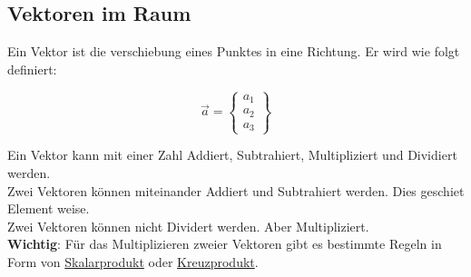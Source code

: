 \subsection{Vektoren im Raum}
Ein Vektor ist die verschiebung eines Punktes in eine Richtung.
Er wird wie folgt definiert: 

\[
\vec{a} =
\begin{Bmatrix}
    a_1 \\ a_2 \\ a_3
\end{Bmatrix}
\]

Ein Vektor kann mit einer Zahl Addiert, Subtrahiert, Multipliziert und Dividiert werden. \\
Zwei Vektoren können miteinander Addiert und Subtrahiert werden. Dies geschiet Element weise. \\
Zwei Vektoren können nicht Dividert werden. Aber Multipliziert. \\
\textbf{Wichtig}: Für das Multiplizieren zweier Vektoren gibt es bestimmte Regeln in Form von 
\hyperref[sec:skalarprodukt]{Skalarprodukt}
oder 
\hyperref[sec:kreuzprodukt]{Kreuzprodukt}. 

